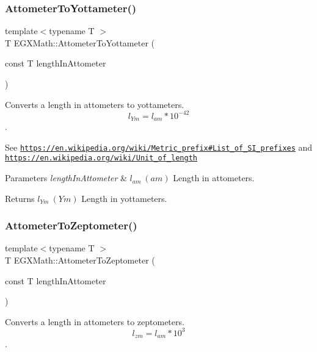 \subsubsection{\texorpdfstring{Attometer\+To\+Yottameter()}{AttometerToYottameter()}}
{\footnotesize\ttfamily template$<$typename T $>$ \\
T E\+G\+X\+Math\+::\+Attometer\+To\+Yottameter (\begin{DoxyParamCaption}\item[{const T}]{length\+In\+Attometer }\end{DoxyParamCaption})}



Converts a length in attometers to yottameters. \[ l_{Ym}=l_{am} * 10^{-42} \]. 

See \href{https://en.wikipedia.org/wiki/Metric_prefix#List_of_SI_prefixes}{\tt https\+://en.\+wikipedia.\+org/wiki/\+Metric\+\_\+prefix\#\+List\+\_\+of\+\_\+\+S\+I\+\_\+prefixes} and \href{https://en.wikipedia.org/wiki/Unit_of_length}{\tt https\+://en.\+wikipedia.\+org/wiki/\+Unit\+\_\+of\+\_\+length} 
\begin{DoxyParams}{Parameters}
{\em length\+In\+Attometer} & $ l_{am}\ (am)$ Length in attometers. \\
\hline
\end{DoxyParams}
\begin{DoxyReturn}{Returns}
$ l_{Ym}\ (Ym)$ Length in yottameters. 
\end{DoxyReturn}
\mbox{\label{group___e_g_x_math-_conversions-_length_conversions-_s_i-_attometer-_s_i_ga88493321ed49951744e5afe2b0bf7e5c}} 
\subsubsection{\texorpdfstring{Attometer\+To\+Zeptometer()}{AttometerToZeptometer()}}
{\footnotesize\ttfamily template$<$typename T $>$ \\
T E\+G\+X\+Math\+::\+Attometer\+To\+Zeptometer (\begin{DoxyParamCaption}\item[{const T}]{length\+In\+Attometer }\end{DoxyParamCaption})}



Converts a length in attometers to zeptometers. \[ l_{zm}=l_{am} * 10^{3} \]. 

